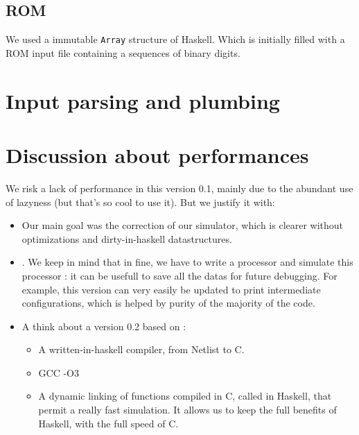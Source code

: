 \documentclass[a4paper, 11pt]{article}
\newcommand\co[1]{\texttt{#1}}
\begin{document}
\subsection{ROM}
We used a immutable \co{Array} structure of Haskell. Which is initially filled with a
ROM input file containing a sequences of binary digits. 

\section{Input parsing and plumbing}

\section{Discussion about performances}
We risk a lack of performance in this version 0.1, mainly due to the
abundant use of lazyness (but that's so cool to use it). But we 
justify it with:  
\begin{itemize} 
\item Our main goal was the correction of our simulator, which is clearer without
optimizations and dirty-in-haskell datastructures.
\item. We keep in mind that
in fine, we have to write a processor and simulate this processor : it
can be usefull to save all the datas for future debugging. For example, this version
can very easily be updated to print intermediate configurations, which
is helped by purity of the majority of the code.   
\item A think about a version 0.2 based on :
\begin{itemize}
\item A written-in-haskell compiler, from Netlist to C.
\item GCC -O3
\item A dynamic linking of functions compiled in C, called in Haskell,
that permit a really fast simulation. It allows us to keep the full
benefits of 
Haskell, with the full speed of C.

\end{itemize}
\end{itemize}
\end{document}

